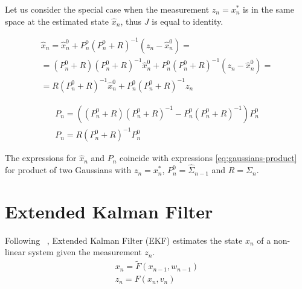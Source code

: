 \documentclass[10pt,twocolumn,letterpaper]{article}
\begin{document}
\begin{table}[!h] 
\centering
\caption{Time and measurement update for KF with $A$ equal to identity} 
\end{table}

Let us consider the special case when the measurement $z_n = x_n^*$ is in the same space at the estimated state $\hat{x}_n$, thus $J$ is equal to identity.

\begin{align*}
\hat{x}_n = \hat{x}_n^0 + P_n^0  (P_n^0 + R)^{-1}(z_n - \hat{x}_n^0) = \\
= (P_n^0 + R)(P_n^0 + R)^{-1}\hat{x}_n^0 + P_n^0  (P_n^0 + R)^{-1}(z_n - \hat{x}_n^0) = \\
= R(P_n^0 + R)^{-1}\hat{x}_n^0 + P_n^0  (P_n^0 + R)^{-1}z_n 
 \end{align*}

\begin{align*}
P_n = ((P_n^0 + R) (P_n^0 + R)^{-1} - P_n^0  (P_n^0 + R)^{-1}) P_n^0\\
P_n = R (P_n^0 + R)^{-1} P_n^0
\end{align*}

The expressions for $\hat{x}_n$ and $P_n$ coincide with expressions \ref{eq:gaussians-product} for product of two Gaussians  with $z_n = x_n^*$, $P_n^0 = \hat{\Sigma}_{n - 1}$ and $R = \Sigma_{n}$.

\section{Extended Kalman Filter}

Following ~\cite{welch1995introduction}, Extended Kalman Filter (EKF) estimates the state $x_n$  of a non-linear system given the measurement $z_n$.
\begin{align}
x_n = \tilde{F}(x_{n - 1},  w_{n - 1}) \\
z_n = F(x_n, v_n)
\end{align}
\end{document}
